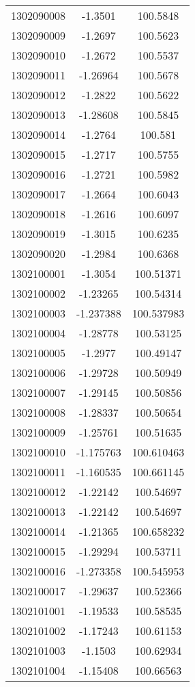 \begin{longtable}[h]{lcc}
		1302090008 & -1.3501 & 100.5848\\ 
		1302090009 & -1.2697 & 100.5623\\ 
		1302090010 & -1.2672 & 100.5537\\ 
		1302090011 & -1.26964 & 100.5678\\ 
		1302090012 & -1.2822 & 100.5622\\ 
		1302090013 & -1.28608 & 100.5845\\ 
		1302090014 & -1.2764 & 100.581\\ 
		1302090015 & -1.2717 & 100.5755\\ 
		1302090016 & -1.2721 & 100.5982\\ 
		1302090017 & -1.2664 & 100.6043\\ 
		1302090018 & -1.2616 & 100.6097\\ 
		1302090019 & -1.3015 & 100.6235\\ 
		1302090020 & -1.2984 & 100.6368\\ 
		1302100001 & -1.3054 & 100.51371\\ 
		1302100002 & -1.23265 & 100.54314\\ 
		1302100003 & -1.237388 &  100.537983\\ 
		1302100004 & -1.28778 & 100.53125\\ 
		1302100005 & -1.2977 & 100.49147\\ 
		1302100006 & -1.29728 & 100.50949\\ 
		1302100007 & -1.29145 & 100.50856\\ 
		1302100008 & -1.28337 & 100.50654\\ 
		1302100009 & -1.25761 & 100.51635\\ 
		1302100010 & -1.175763 &  100.610463\\ 
		1302100011 & -1.160535 &  100.661145\\ 
		1302100012 & -1.22142 & 100.54697\\ 
		1302100013 & -1.22142 & 100.54697\\ 
		1302100014 & -1.21365 & 100.658232\\ 
		1302100015 & -1.29294 & 100.53711\\ 
		1302100016 & -1.273358 &  100.545953\\ 
		1302100017 & -1.29637 & 100.52366\\ 
		1302101001 & -1.19533 & 100.58535\\ 
		1302101002 & -1.17243 & 100.61153\\ 
		1302101003 & -1.1503 & 100.62934\\ 
		1302101004 & -1.15408 & 100.66563\\ 

\end{longtable}
